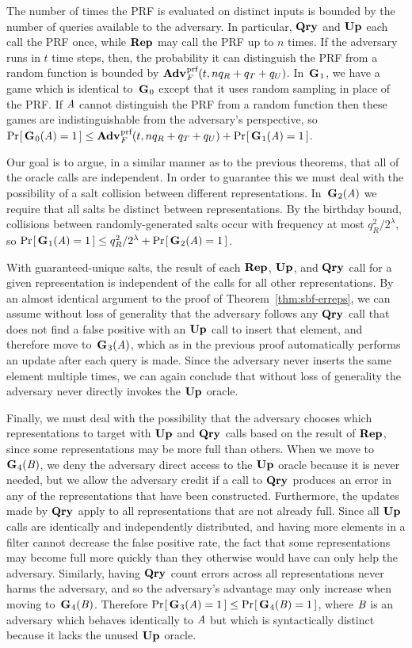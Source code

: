 The number of times the PRF is evaluated on distinct inputs is bounded by the number of queries available to the adversary. In particular, $\textup{\textbf{Qry}}\hspace{0.5pt}$ and $\textup{\textbf{Up}}\hspace{0.5pt}$ each call the PRF once, while $\textup{\textbf{Rep}}\hspace{0.5pt}$ may call the PRF up to $n$ times. If the adversary runs in $t$ time steps, then, the probability it can distinguish the PRF from a random function is bounded by $\Adv{\prf}_F(t,nq_R+q_T+q_U)$. In~$\textup{\textbf{G}}\hspace{0.5pt}_1$, we have a game which is identical to~$\textup{\textbf{G}}\hspace{0.5pt}_0$ except that it uses random sampling in place of the PRF. If $\mathit{A}$ cannot distinguish the PRF from a random function then these games are indistinguishable from the adversary's perspective, so $\Prob{\game_0(\advA) = 1} \le \Adv{\prf}_F(t,nq_R+q_T+q_U) + \Prob{\game_1(\advA) = 1}$.

Our goal is to argue, in a similar manner as to the previous theorems, that all of the oracle calls are independent. In order to guarantee this we must deal with the possibility of a salt collision between different representations. In~$\textup{\textbf{G}}\hspace{0.5pt}_2(\mathit{A})$ we require that all salts be distinct between representations. By the birthday bound, collisions between randomly-generated salts occur with frequency at most $q_R^2/2^\lambda$, so $\Pr\hspace{-1pt}\left[\,\textup{\textbf{G}}\hspace{0.5pt}_1(\mathit{A}) = 1\,\right] \le q_R^2/2^\lambda + \Pr\hspace{-1pt}\left[\,\textup{\textbf{G}}\hspace{0.5pt}_2(\mathit{A}) = 1\,\right]$.

With guaranteed-unique salts, the result of each $\textup{\textbf{Rep}}\hspace{0.5pt}$, $\textup{\textbf{Up}}\hspace{0.5pt}$, and $\textup{\textbf{Qry}}\hspace{0.5pt}$ call for a given representation is independent of the calls for all other representations. By an almost identical argument to the proof of Theorem~\ref{thm:sbf-erreps}, we can assume without loss of generality that the adversary follows any $\textup{\textbf{Qry}}\hspace{0.5pt}$ call that does not find a false positive with an $\textup{\textbf{Up}}\hspace{0.5pt}$ call to insert that element, and therefore move to~$\textup{\textbf{G}}\hspace{0.5pt}_3(\mathit{A})$, which as in the previous proof automatically performs an update after each query is made. Since the adversary never inserts the same element multiple times, we can again conclude that without loss of generality the adversary never directly invokes the $\textup{\textbf{Up}}\hspace{0.5pt}$ oracle.

Finally, we must deal with the possibility that the adversary chooses which representations to target with $\textup{\textbf{Up}}\hspace{0.5pt}$ and $\textup{\textbf{Qry}}\hspace{0.5pt}$ calls based on the result of $\textup{\textbf{Rep}}\hspace{0.5pt}$, since some representations may be more full than others. When we move to~$\textup{\textbf{G}}\hspace{0.5pt}_4(\mathit{B})$, we deny the adversary direct access to the $\textup{\textbf{Up}}\hspace{0.5pt}$ oracle because it is never needed, but we allow the adversary credit if a call to $\textup{\textbf{Qry}}\hspace{0.5pt}$ produces an error in any of the representations that have been constructed. Furthermore, the updates made by $\textup{\textbf{Qry}}\hspace{0.5pt}$ apply to all representations that are not already full. Since all $\textup{\textbf{Up}}\hspace{0.5pt}$ calls are identically and independently distributed, and having more elements in a filter cannot decrease the false positive rate, the fact that some representations may become full more quickly than they otherwise would have can only help the adversary. Similarly, having $\textup{\textbf{Qry}}\hspace{0.5pt}$ count errors across all representations never harms the adversary, and so the adversary's advantage may only increase when moving to~$\textup{\textbf{G}}\hspace{0.5pt}_4(\mathit{B})$. Therefore $\Pr\hspace{-1pt}\left[\,\textup{\textbf{G}}\hspace{0.5pt}_3(\mathit{A}) = 1\,\right] \le \Pr\hspace{-1pt}\left[\,\textup{\textbf{G}}\hspace{0.5pt}_4(\mathit{B}) = 1\,\right]$, where $\mathit{B}$ is an adversary which behaves identically to $\mathit{A}$ but which is syntactically distinct because it lacks the unused $\textup{\textbf{Up}}\hspace{0.5pt}$ oracle.

